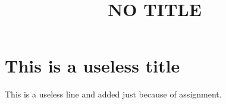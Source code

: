 \documentclass{article}
\title{NO TITLE}
\begin{document}
\section*{This is a useless title}
This is a useless line and added just because of\cite{linear} assignment.
	
	
\end{document}
